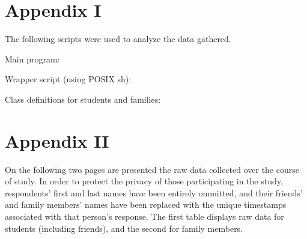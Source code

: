 \documentclass[12pt]{report}
\begin{document}
\chapter*{Appendix I}
The following scripts were used to analyze the data gathered.

Main program:



Wrapper script (using POSIX sh):



Class definitions for students and families:



\chapter*{Appendix II}
On the following two pages are presented the raw data collected over the course of study. In order to protect the privacy of those participating in the study, respondents' first and last names have been entirely ommitted, and their friends' and family members' names have been replaced with the unique timestamps associated with that person's response. The first table displays raw data for students (including friends), and the second for family members.



\restoregeometry
\end{document}
